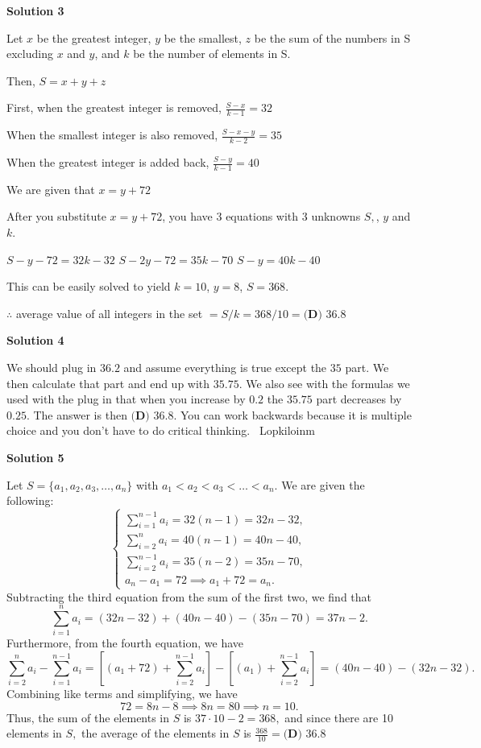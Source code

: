 \begin{enumerate}
 



\textbf{Solution 3}

Let $x$ be the greatest integer, $y$ be the smallest, $z$ be the sum of the numbers in S excluding $x$ and $y$, and $k$ be the number of elements in S.

 Then, $S=x+y+z$

 First, when the greatest integer is removed, $\frac{S-x}{k-1}=32$

 When the smallest integer is also removed, $\frac{S-x-y}{k-2}=35$

 When the greatest integer is added back, $\frac{S-y}{k-1}=40$

 We are given that $x=y+72$

 
After you substitute $x=y+72$, you have 3 equations with 3 unknowns $S,$, $y$ and $k$.

 $S-y-72=32k-32$
$S-2y-72=35k-70$
$S-y=40k-40$

 This can be easily solved to yield $k=10$, $y=8$, $S=368$.

 $\therefore$ average value of all integers in the set $=S/k = 368/10 = \boxed{\textbf{(D) }36.8}$




\textbf{Solution 4}

We should plug in $36.2$ and assume everything is true except the $35$ part. We then calculate that part and end up with $35.75$. We also see with the formulas we used with the plug in that when you increase by $0.2$ the $35.75$ part decreases by $0.25$. The answer is then $\boxed{\textbf{(D) }36.8}$. You can work backwards because it is multiple choice and you don't have to do critical thinking. ~Lopkiloinm

 



\textbf{Solution 5}

Let $S = \{a_1, a_2, a_3, \hdots, a_n\}$ with $a_1 < a_2 < a_3 < \hdots < a_n.$ We are given the following: 
 \[{\begin{cases} \sum_{i=1}^{n-1} a_i = 32(n-1) = 32n-32, \\ \sum_{i=2}^n a_i = 40(n-1) = 40n-40, \\ \sum_{i=2}^{n-1} a_i = 35(n-2) = 35n-70, \\ a_n-a_1 = 72 \implies a_1 + 72 = a_n. \end{cases}}\] Subtracting the third equation from the sum of the first two, we find that 
 \[\sum_{i=1}^n a_i = \left(32n-32\right) + \left(40n-40\right) - \left(35n-70\right) = 37n - 2.\] Furthermore, from the fourth equation, we have 
 \[\sum_{i=2}^{n} a_i - \sum_{i=1}^{n-1} a_i = \left[\left(a_1 + 72\right) + \sum_{i=2}^{n-1} a_i\right] - \left[\left(a_1\right) + \sum_{i=2}^{n-1} a_i\right] = \left(40n-40\right)-\left(32n-32\right).\] Combining like terms and simplifying, we have 
 \[72 = 8n-8 \implies 8n = 80 \implies n=10.\] Thus, the sum of the elements in $S$ is $37 \cdot 10 - 2 = 368,$ and since there are 10 elements in $S,$ the average of the elements in $S$ is $\frac{368}{10}=\boxed{\textbf{(D) }36.8}$





\end{enumerate}
